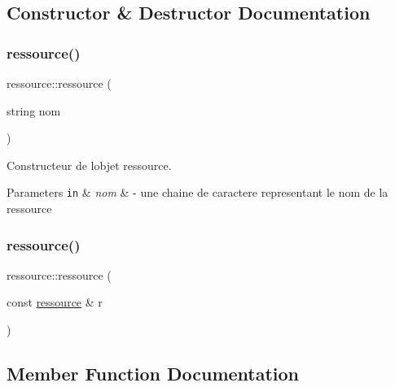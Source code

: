 \subsection{Constructor \& Destructor Documentation}
\hypertarget{classressource_a261f4c729d03d562e1d35187999ce4ef}{}\label{classressource_a261f4c729d03d562e1d35187999ce4ef} 
\subsubsection{\texorpdfstring{ressource()}{ressource()}\hspace{0.1cm}{\footnotesize\ttfamily [1/2]}}
{\footnotesize\ttfamily ressource\+::ressource (\begin{DoxyParamCaption}\item[{string}]{nom }\end{DoxyParamCaption})}



Constructeur de l\textquotesingle{}objet ressource. 


\begin{DoxyParams}[1]{Parameters}
\mbox{\tt in}  & {\em nom} & -\/ une chaine de caractere representant le nom de la ressource \\
\hline
\end{DoxyParams}
\hypertarget{classressource_adccfe979d5ccf07ae4f0cfa944e9f1b0}{}\label{classressource_adccfe979d5ccf07ae4f0cfa944e9f1b0} 
\subsubsection{\texorpdfstring{ressource()}{ressource()}\hspace{0.1cm}{\footnotesize\ttfamily [2/2]}}
{\footnotesize\ttfamily ressource\+::ressource (\begin{DoxyParamCaption}\item[{const \hyperlink{classressource}{ressource} \&}]{r }\end{DoxyParamCaption})\hspace{0.3cm}{\ttfamily [default]}}



\subsection{Member Function Documentation}
\hypertarget{classressource_a2c2b1bee5ae87b3accdd84c088aef2fd}{}\label{classressource_a2c2b1bee5ae87b3accdd84c088aef2fd} 
